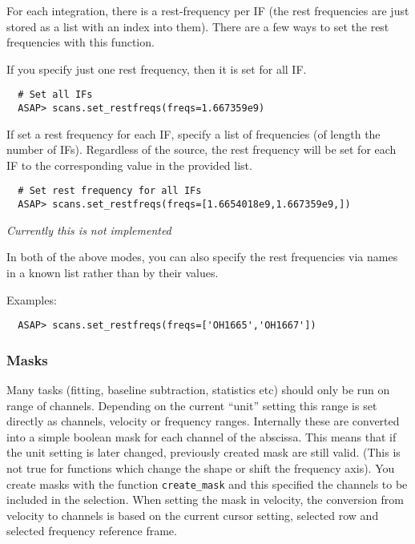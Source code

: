 \documentclass[11pt]{article}
\newcommand{\cmd}[1]{{\tt #1}}
\begin{document}
For each integration, there is a rest-frequency per IF (the rest
frequencies are just stored as a list with an index into them).
There are a few ways to set the rest frequencies with this function.

If you specify just one rest frequency, then it is set for all IF.

\begin{verbatim}
  # Set all IFs
  ASAP> scans.set_restfreqs(freqs=1.667359e9)
\end{verbatim}

If set a rest frequency for each IF, specify a list of frequencies (of
length the number of IFs).  Regardless of the source, the rest
frequency will be set for each IF to the corresponding value in the
provided list. 

\begin{verbatim}
  # Set rest frequency for all IFs
  ASAP> scans.set_restfreqs(freqs=[1.6654018e9,1.667359e9,])

\end{verbatim}

{\em Currently this is not implemented}

In both of the above modes, you can also specify the rest frequencies via
names in a known list rather than by their values.

Examples:

\begin{verbatim}
  ASAP> scans.set_restfreqs(freqs=['OH1665','OH1667'])
\end{verbatim}


\subsubsection{Masks}


Many tasks (fitting, baseline subtraction, statistics etc) should only
be run on range of channels. Depending on the current ``unit'' setting
this range is set directly as channels, velocity or frequency
ranges. Internally these are converted into a simple boolean mask for
each channel of the abscissa. This means that if the unit setting is
later changed, previously created mask are still valid. (This is not
true for functions which change the shape or shift the frequency
axis).  You create masks with the function \cmd{create\_mask} and this
specified the channels to be included in the selection. When setting
the mask in velocity, the conversion from velocity to channels is
based on the current cursor setting, selected row and selected
frequency reference frame.
\end{document}
